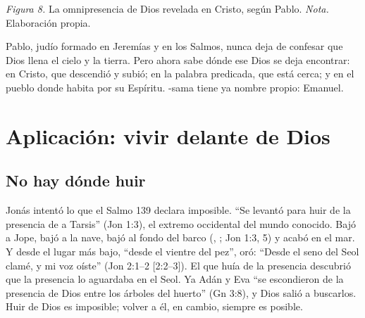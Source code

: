 \begin{center}
\par
{\footnotesize\color{gris}\textit{Figura 8.} La omnipresencia de Dios revelada en Cristo, según Pablo. \textit{Nota.} Elaboración propia.}
\end{center}

Pablo, judío formado en Jeremías y en los Salmos, nunca deja de confesar que Dios llena el cielo y la tierra. Pero ahora sabe dónde ese Dios se deja encontrar: en Cristo, que descendió y subió; en la palabra predicada, que está cerca; y en el pueblo donde habita por su Espíritu. \SENOR{}-sama tiene ya nombre propio: Emanuel.

\section{Aplicación: vivir delante de Dios}

\subsection{No hay dónde huir}

Jonás intentó lo que el Salmo 139 declara imposible. ``Se levantó para huir de la presencia de \SENOR{} a Tarsis'' (Jon 1:3), el extremo occidental del mundo conocido. Bajó a Jope, bajó a la nave, bajó al fondo del barco (, ; Jon 1:3, 5) y acabó en el mar. Y desde el lugar más bajo, ``desde el vientre del pez'', oró: ``Desde el seno del Seol clamé, y mi voz oíste'' (Jon 2:1--2 [2:2--3]). El que huía de la presencia descubrió que la presencia lo aguardaba en el Seol. Ya Adán y Eva ``se escondieron de la presencia de \SENOR{} Dios entre los árboles del huerto'' (Gn 3:8), y Dios salió a buscarlos. Huir de Dios es imposible; volver a él, en cambio, siempre es posible.

